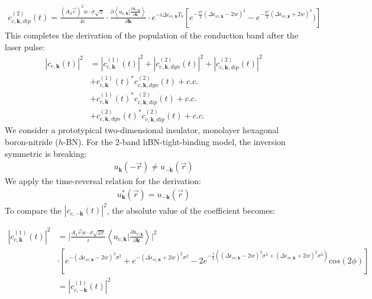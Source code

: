 \begin{equation}
\begin{aligned}
    c^{(2)}_{c,\mathbf k,dip}(t)=\frac{(A_2 \vec e)^2 w \cdot \sigma \sqrt{\pi}}{4i} \cdot \frac{\partial{\left \langle u_{c,\mathbf k}\Big |\frac{\partial u_{v,\mathbf k}}{\partial \mathbf k} \right \rangle}}{\partial {\mathbf k}} \cdot e^{-i\Delta \epsilon_{vc,\mathbf k} T_0} [e^{-\frac{\sigma^2}{4} (\Delta \epsilon_{vc,\mathbf k}-2w)^2}-e^{-\frac{\sigma^2}{4} (\Delta \epsilon_{vc,\mathbf k}+2w)^2})]
\end{aligned}
\end{equation}
This completes the derivation of the population of the conduction band after the laser pulse:
\begin{equation}
\begin{aligned}
|c_{c,\mathbf k}(t)|^2&=|c^{(1)}_{c,\mathbf k}(t)|^2+|c^{(2)}_{c,\mathbf k,dyn}(t)|^2+|c^{(2)}_{c,\mathbf k,dip}(t)|^2\\
    &+ c^{(1)}_{c,\mathbf k}(t)^* c^{(2)}_{c,\mathbf k,dyn}(t) +c.c.\\
    &+c^{(1)}_{c,\mathbf k}(t)^* c^{(2)}_{c,\mathbf k,dip}(t)+c.c.\\
    &+c^{(2)}_{c,\mathbf k,dyn}(t)^* c^{(2)}_{c,\mathbf k,dip}(t)+c.c.
\end{aligned}
\end{equation}
We consider a prototypical two-dimensional insulator, monolayer hexagonal boron-nitride ($h$-BN). For the 2-band hBN-tight-binding model, the inversion symmetric is breaking:
\begin{align}
u_{\mathbf k}(-\vec r)\neq u_{-\mathbf k}(\vec r)    
\end{align}
We apply the time-reversal relation for the derivation:
\begin{align}
u^*_{\mathbf k}(\vec r)= u_{-\mathbf k}(\vec r)   
\end{align}
To compare the $|c_{c,-\mathbf k}(t)|^2$, the absolute value of the coefficient becomes:

\begin{equation}
\begin{aligned}
  |c^{(1)}_{c,\mathbf k}(t)|^2 &=\lvert \frac{A_1 \vec e w \cdot \sigma \sqrt{2\pi}}{i} \left \langle
  u_{c,\mathbf k}\Big |\frac{\partial u_{v,\mathbf k}}{\partial \mathbf k} \right \rangle \rvert^2\\ 
 & \cdot [e^{-(\Delta \epsilon_{vc,\mathbf k} - 2w)^2 \sigma^2}
    +e^{-(\Delta \epsilon_{vc,\mathbf k} + 2w)^2 \sigma^2}
    -2e^{-\frac{1}{2}((\Delta \epsilon_{vc,\mathbf k} - 2w)^2 \sigma^2
    +(\Delta \epsilon_{vc,\mathbf k} + 2w)^2 \sigma^2)}cos(2\phi)]\\
    &=  |c^{(1)}_{c,-\mathbf k}(t)|^2
\end{aligned}
\end{equation}

